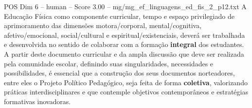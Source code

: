 \begin{textsample}{POS Dim 6 – human – Score 3.00 – mg/mg\_ef\_linguagens\_ed\_fis\_2\_p12.txt}  \label{ex:f6_pos_020}
A Educação Física como componente curricular, tempo e espaço privilegiado de aprimoramento das dimensões motora/corporal, mental/cognitiva, afetivo/emocional, social/cultural e espiritual/existenciais, deverá ser trabalhada e desenvolvida no sentido de colaborar com a formação \textbf{integral} dos estudantes.
A partir deste documento curricular e da ampla discussão que deve ser realizada pela comunidade escolar, definindo suas singularidades, necessidades e possibilidades, é essencial que a construção dos seus documentos norteadores, entre eles o Projeto Político Pedagógico, seja feita de forma \textbf{coletiva}, valorizando práticas interdisciplinares e que contemple objetivos contemporâneos e estratégias formativas inovadoras.

\end{textsample}
